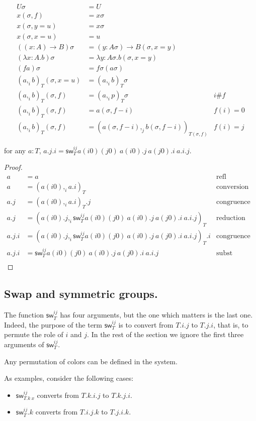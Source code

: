 \documentclass[10pt,a4paper]{article}
\newcommand\CC[4]{(#2,_{#1} #3)_{#4}}
\newcommand\sw[2]{\mathsf{sw}^{#1}_{#2}}
\begin{document}
\begin{align*}
  Uσ &= U \\
  x(σ,f) &= xσ \\
  x(σ,y=u) &= xσ \\
  x(σ,x=u) &= u \\
  ((x:A)→ B)σ &= (y:Aσ) → B(σ,x=y) \\
  (λ x:A. b)σ &= λ y:Aσ. b(σ,x=y) \\
  (f a)σ &= fσ  (aσ) \\
  (a,_i b)_T(σ,x=u)  &= (a,_i b)_Tσ  \\
  (a,_i b)_T(σ,f)  &= (a,_i p)_Tσ & i \# f \\
  (a,_i b)_T(σ,f)  &= a(σ,f-i) & f(i) = 0 \\
  (a,_i b)_T(σ,f)  &= (a(σ,f-i),_j b(σ,f-i))_{T(σ,f)} & f(i) = j
\end{align*}

\begin{lemma}\label{lem:term-swap}
  for any $a:T$, $a.j.i = \sw {ij} T a(i0)(j0)~a(i0).j~a(j0).i~a.i.j$.
\end{lemma}
\begin{proof}
  \begin{align*}
    a &= a & \text{refl} \\
    a &= \CC i {a(i0)} {a.i} T & \text{conversion rule} \\
    a.j & = \CC i {a(i0)} {a.i} T .j & \text{congruence} \\
    a.j & = \CC i {a(i0).j} {\sw{ij} T a(i0)(j0)~a(i0).j~a(j0).i~a.i.j} T & \text{reduction} \\
    a.j.i & = \CC i {a(i0).j} {\sw{ij} T a(i0)(j0)~a(i0).j~a(j0).i~a.i.j} T.i & \text{congruence} \\
    a.j.i & = \sw{ij} T a(i0)(j0)~a(i0).j~a(j0).i~a.i.j & \text{subst} \\
\end{align*}
\end{proof}
\subsection{Swap and symmetric groups.}

The function $\sw {ij} T$ has four arguments, but the one which
matters is the last one.  Indeed, the purpose of the term $\sw {ij} T$
is to convert from $T.i.j$ to $T.j.i$, that is, to permute the role of
$i$ and $j$. In the rest of the section we ignore the first three
arguments of $\sw {ij} T$.

\begin{theorem}
Any permutation of colors can be defined in the system.

As examples, consider the following cases:
\begin{itemize}
\item $\sw{ij} {T.k~x}$ converts from $T.k.i.j$ to $T.k.j.i$.
\item $\sw{ij} {T}.k$ converts from $T.i.j.k$ to $T.j.i.k$.
\end{itemize}

\end{theorem}
\end{document}
